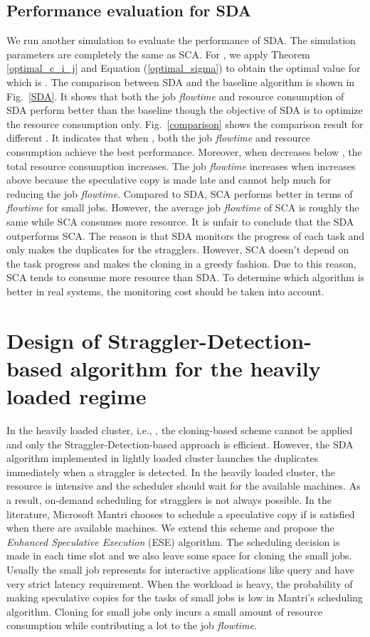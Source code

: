\documentclass[10pt,conference]{IEEEtran}
\begin{document}
\subsection{Performance evaluation for SDA}
We run another simulation to evaluate the performance of SDA. The simulation parameters are completely the same as SCA. For , we apply Theorem \ref{optimal_c_i_j} and Equation (\ref{optimal_sigma}) to obtain the optimal value for  which is . The comparison between SDA and the baseline algorithm is shown in Fig.~\ref{SDA}. It shows that both the job \textit{flowtime} and resource consumption of SDA perform better than the baseline though the objective of SDA is to optimize the resource consumption only. Fig.~\ref{comparison} shows the comparison result for different . It indicates that when , both the job \textit{flowtime} and resource consumption achieve the best performance. Moreover, when  decreases below , the total resource consumption increases. The job \textit{flowtime} increases when  increases above  because the speculative copy is made late and cannot help much for reducing the job \textit{flowtime}. Compared to SDA, SCA performs better in terms of \textit{flowtime} for small jobs. However, the average job \textit{flowtime} of SCA is roughly the same while SCA consumes more resource. It is unfair to conclude that the SDA outperforms SCA. The reason is that SDA monitors the progress of each task and only makes the duplicates for the stragglers. However, SCA doesn't depend on the task progress and makes the cloning in a greedy fashion. Due to this reason, SCA tends to consume more resource than SDA. To determine which algorithm is better in real systems, the monitoring cost should be taken into account.

\section{Design of Straggler-Detection-based algorithm for the heavily loaded regime}
\label{ESE_design}
In the heavily loaded cluster, i.e., , the cloning-based scheme cannot be applied and only the Straggler-Detection-based approach is efficient.  However, the SDA algorithm implemented in lightly loaded cluster launches the duplicates immediately when a straggler is detected. In the heavily loaded cluster, the resource is intensive and the scheduler should wait for the available machines. As a result, on-demand scheduling for stragglers is not always possible. In the literature, Microsoft Mantri {\cite{Outliers}} chooses to schedule a speculative copy if  is satisfied when there are available machines. We extend this scheme and propose the \textit{Enhanced Speculative Execution} (ESE) algorithm. The scheduling decision is made in each time slot and we also leave some space for cloning the small jobs. Usually the small job represents for interactive applications like query and have very strict latency requirement. When the workload is heavy, the probability of making speculative copies for the tasks of small jobs is low in Mantri's scheduling algorithm. Cloning for small jobs only incurs a small amount of resource consumption while contributing a lot to the job \textit{flowtime}.
\end{document}
